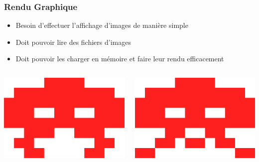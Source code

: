 \documentclass{beamer}
\newcommand{\<}[1]{\`#1}
\begin{document}
\begin{frame}
  \frametitle{Rendu Graphique}
  
  \begin{itemize}
  \item Besoin d'effectuer l'affichage d'images de manière simple
  \item Doit pouvoir lire des fichiers d'images
  \item Doit pouvoir les charger en mémoire et faire leur rendu
    efficacement
  \end{itemize}

  \begin{block}{}
    \begin{columns}[c]
      \begin{column}[c]{2cm}
        \includegraphics[scale=0.2]{easy0}
      \end{column}
      \begin{column}[c]{2cm}
        \includegraphics[scale=0.2]{easy1}
      \end{column}
    \end{columns}
  \end{block}

\end{frame}
\end{document}
